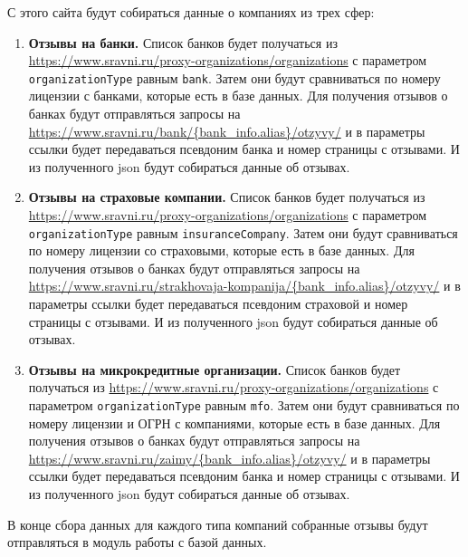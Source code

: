 \documentclass[PI, VKR]{HSEUniversity}
\begin{document}
С этого сайта будут собираться данные о компаниях из трех сфер:
\begin{enumerate}
\item \textbf{Отзывы на банки.}
Список банков будет получаться из \url{https://www.sravni.ru/proxy-organizations/organizations} с параметром \texttt{organizationType} равным \texttt{bank}. Затем они будут сравниваться по номеру лицензии с банками, которые есть в базе данных. Для получения отзывов о банках будут отправляться запросы на \url{https://www.sravni.ru/bank/\{bank\_info.alias\}/otzyvy/} и в параметры ссылки будет передаваться псевдоним банка и номер страницы с отзывами. И из полученного json будут собираться данные об отзывах.
\item \textbf{Отзывы на страховые компании.}
Список банков будет получаться из \url{https://www.sravni.ru/proxy-organizations/organizations} с параметром \texttt{organizationType} равным \texttt{insuranceCompany}. Затем они будут сравниваться по номеру лицензии со страховыми, которые есть в базе данных. Для получения отзывов о банках будут отправляться запросы на \url{https://www.sravni.ru/strakhovaja-kompanija/\{bank\_info.alias\}/otzyvy/} и в параметры ссылки будет передаваться псевдоним страховой и номер страницы с отзывами. И из полученного json будут собираться данные об отзывах.
\item \textbf{Отзывы на микрокредитные организации.}
Список банков будет получаться из \url{https://www.sravni.ru/proxy-organizations/organizations} с параметром \texttt{organizationType} равным \texttt{mfo}. Затем они будут сравниваться по номеру лицензии и ОГРН с компаниями, которые есть в базе данных. Для получения отзывов о банках будут отправляться запросы на \url{https://www.sravni.ru/zaimy/\{bank\_info.alias\}/otzyvy/} и в параметры ссылки будет передаваться псевдоним банка и номер страницы с отзывами. И из полученного json будут собираться данные об отзывах.
\end{enumerate}
В конце сбора данных для каждого типа компаний собранные отзывы будут отправляться в модуль работы с базой данных.
\end{document}
